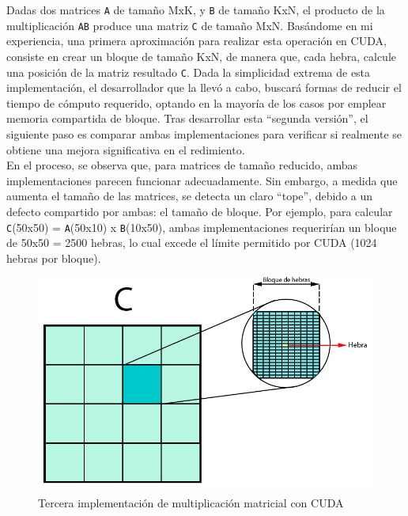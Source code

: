 Dadas dos matrices \texttt{A} de tamaño MxK, y \texttt{B} de tamaño KxN, el producto de la multiplicación \texttt{AB} produce una matriz \texttt{C} de tamaño MxN. Basándome en mi experiencia, una primera aproximación para realizar esta operación en CUDA, consiste en crear un bloque de tamaño KxN, de manera que, cada hebra, calcule una posición de la matriz resultado \texttt{C}. Dada la simplicidad extrema de esta implementación, el desarrollador que la llevó a cabo, buscará formas de reducir el tiempo de cómputo requerido, optando en la mayoría de los casos por emplear memoria compartida de bloque. Tras desarrollar esta ``segunda versión'', el siguiente paso es comparar ambas implementaciones para verificar si realmente se obtiene una mejora significativa en el redimiento. \\
En el proceso, se observa que, para matrices de tamaño reducido, ambas implementaciones parecen funcionar adecuadamente. Sin embargo, a medida que aumenta el tamaño de las matrices, se detecta un claro ``tope'', debido a un defecto compartido por ambas: el tamaño de bloque. Por ejemplo, para calcular \texttt{C}(50x50) = \texttt{A}(50x10) x \texttt{B}(10x50), ambas implementaciones requerirían un bloque de 50x50 = 2500 hebras, lo cual excede el límite permitido por CUDA (1024 hebras por bloque). \\

\begin{figure}[H]
	\centering
	\includegraphics[scale=0.3]{imagenes/gemm_tile_v3.jpg}  
	\caption{Tercera implementación de multiplicación matricial con CUDA}
	\label{fig:mult_matrix_cuda_v3}
\end{figure}

